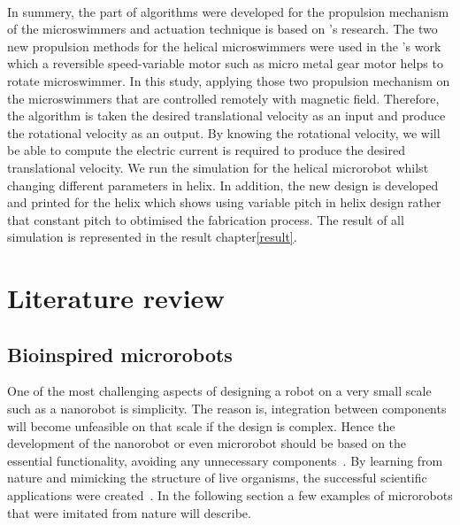 \documentclass[12pt,a4paper,titlepage]{report}
\begin{document}
\paragraph{}
In summery, the part of algorithms were developed for the propulsion mechanism of the microswimmers
and actuation technique is based on \citeauthor{mahoney2011velocity}\rq{}s research. The two new 
propulsion methods for the helical microswimmers were used in the \citeauthor{rodenborn2013propulsion}\rq{}s
work which a reversible speed-variable motor such as micro metal gear motor helps to rotate 
microswimmer. In this study, applying those two propulsion mechanism on the microswimmers that 
are controlled remotely with magnetic field. Therefore, the algorithm is taken the desired translational
velocity as an input and produce the rotational velocity as an output. By knowing the rotational velocity, 
we will be able to compute the electric current is required to produce the desired translational velocity.
We run the simulation for the helical microrobot whilst changing different parameters in helix. 
In addition, the new design is developed and printed for the helix which shows using variable pitch
 in helix design rather that constant pitch to obtimised the fabrication process. The result of all simulation is
represented in the result chapter\ref{result}.





\section{Literature review}
 


\subsection{Bioinspired microrobots}

One of the most challenging aspects of designing a robot on a very small scale such 
as a nanorobot is simplicity. The reason is, integration between components
will become unfeasible on that
 scale if the design is complex. Hence the development of the nanorobot or even microrobot
 should be based on the essential functionality, avoiding any unnecessary components~\citep{gao2013bioinspired}.
By learning from nature and mimicking the structure of live organisms, the successful  
scientific applications were created~\citep{qiunanohelices}. In the following section a
 few examples of microrobots that were imitated from nature will describe. 
 
\end{document}
